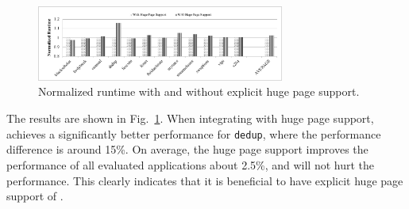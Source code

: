 \begin{figure}[!h]
    \centering
    \includegraphics[width=3.2in]{figure/hugepage.pdf}
    \caption{Normalized runtime with and without explicit huge page support.}
    \label{fig:hugepage}
\end{figure}

The results are shown in Fig.~\ref{fig:hugepage}. When integrating with huge page support, \NM{} achieves a significantly better performance for \texttt{dedup}, where the performance difference is around 15\%. On average, the huge page support improves the performance of all evaluated applications about 2.5\%, and will not hurt the performance. This clearly indicates that it is beneficial to have explicit huge page support of \NM{}.  


